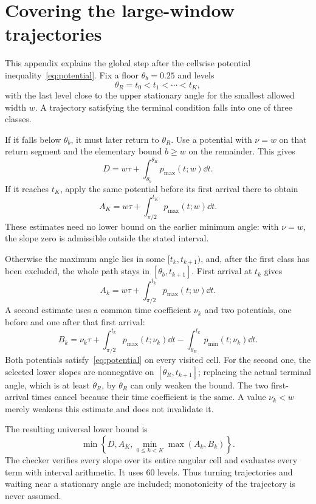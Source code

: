 \appendix
\section{Covering the large-window trajectories}\label{app:stairs}
This appendix explains the global step after the cellwise potential inequality~\eqref{eq:potential}. Fix a floor $\theta_b=0.25$ and levels
\[
 \theta_R=t_0<t_1<\cdots<t_K,
\]
with the last level close to the upper stationary angle for the smallest allowed width $w$. A trajectory satisfying the terminal condition falls into one of three classes.

If it falls below $\theta_b$, it must later return to $\theta_R$. Use a potential with $\nu=w$ on that return segment and the elementary bound $b\ge w$ on the remainder. This gives
\[
 D=w\tau+\int_{\theta_b}^{\theta_R}p_{\max}(t;w)\dd t.
\]
If it reaches $t_K$, apply the same potential before its first arrival there to obtain
\[
 A_K=w\tau+\int_{\pi/2}^{t_K}p_{\max}(t;w)\dd t.
\]
These estimates need no lower bound on the earlier minimum angle: with $\nu=w$, the slope zero is admissible outside the stated interval.

Otherwise the maximum angle lies in some $[t_k,t_{k+1})$, and, after the first class has been excluded, the whole path stays in $[\theta_b,t_{k+1}]$. First arrival at $t_k$ gives
\[
 A_k=w\tau+\int_{\pi/2}^{t_k}p_{\max}(t;w)\dd t.
\]
A second estimate uses a common time coefficient $\nu_k$ and two potentials, one before and one after that first arrival:
\[
 B_k=\nu_k\tau+
       \int_{\pi/2}^{t_k}p_{\max}(t;\nu_k)\dd t
       -\int_{\theta_R}^{t_k}p_{\min}(t;\nu_k)\dd t.
\]
Both potentials satisfy~\eqref{eq:potential} on every visited cell. For the second one, the selected lower slopes are nonnegative on $[\theta_R,t_{k+1}]$; replacing the actual terminal angle, which is at least $\theta_R$, by $\theta_R$ can only weaken the bound. The two first-arrival times cancel because their time coefficient is the same. A value $\nu_k<w$ merely weakens this estimate and does not invalidate it.

The resulting universal lower bound is
\[
 \min\left\{D,A_K,\min_{0\le k<K}\max(A_k,B_k)\right\}.
\]
The checker verifies every slope over its entire angular cell and evaluates every term with interval arithmetic. It uses 60 levels. Thus turning trajectories and waiting near a stationary angle are included; monotonicity of the trajectory is never assumed.

